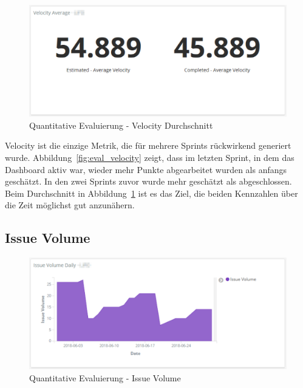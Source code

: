 \begin{savenotes}
    \begin{figure}[H]
      \centering
      \includegraphics[width=1.0\textwidth]{img/eval-velocity-avg.png}
      \caption{Quantitative Evaluierung {-} Velocity Durchschnitt}\label{fig:eval_velocity_avg}
    \end{figure}
\end{savenotes}

Velocity ist die einzige Metrik, die für mehrere Sprints rückwirkend generiert wurde.
Abbildung~\ref{fig:eval_velocity} zeigt, dass im letzten Sprint, in dem das Dashboard aktiv war, wieder mehr Punkte abgearbeitet wurden als anfangs geschätzt.
In den zwei Sprints zuvor wurde mehr geschätzt als abgeschlossen.
Beim Durchschnitt in Abbildung~\ref{fig:eval_velocity_avg} ist es das Ziel, die beiden Kennzahlen über die Zeit möglichst gut anzunähern.

\clearpage
\subsection*{Issue Volume}

\begin{savenotes}
    \begin{figure}[H]
      \centering
      \includegraphics[width=1.0\textwidth]{img/eval-volume.png}
      \caption{Quantitative Evaluierung {-} Issue Volume}\label{fig:eval_issue_volume}
    \end{figure}
\end{savenotes}

